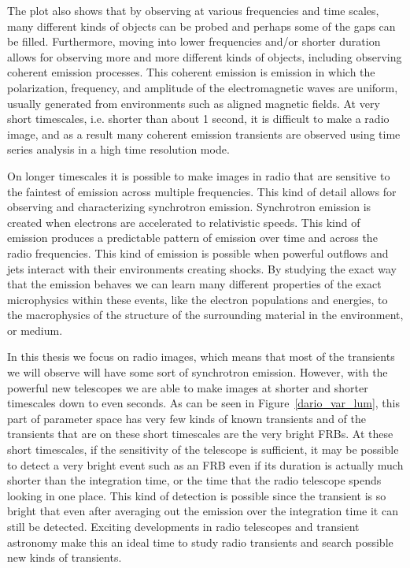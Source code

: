 \documentclass[12pt]{article}
\begin{document}
The plot also shows that by observing at various frequencies and time scales, many different kinds of objects can be probed and perhaps some of the gaps can be filled. Furthermore, moving into lower frequencies and/or shorter duration allows for observing more and more different kinds of objects, including observing coherent emission processes. This coherent emission is emission in which the polarization, frequency, and amplitude of the electromagnetic waves are uniform, usually generated from environments such as aligned magnetic fields. At very short timescales, i.e. shorter than about 1 second, it is difficult to make a radio image, and as a result many coherent emission transients are observed using time series analysis in a high time resolution mode. 

On longer timescales it is possible to make images in radio that are sensitive to the faintest of emission across multiple frequencies. This kind of detail allows for observing and characterizing synchrotron emission. Synchrotron emission is created when electrons are accelerated to relativistic speeds. This kind of emission produces a predictable pattern of emission over time and across the radio frequencies. This kind of emission is possible when powerful outflows and jets interact with their environments creating shocks. By studying the exact way that the emission behaves we can learn many different properties of the exact microphysics within these events, like the electron populations and energies, to the macrophysics of the structure of the surrounding material in the environment, or medium.


 In this thesis we focus on radio images, which means that most of the transients we will observe will have some sort of synchrotron emission. However, with the powerful new telescopes we are able to make images at shorter and shorter timescales down to even seconds. As can be seen in Figure~\ref{dario_var_lum}, this part of parameter space has very few kinds of known transients and of the transients that are on these short timescales are the very bright FRBs. At these short timescales, if the sensitivity of the telescope is sufficient, it may be possible to detect a very bright event such as an FRB even if its duration is actually much shorter than the integration time, or the time that the radio telescope spends looking in one place.  This kind of detection is possible since the transient is so bright that even after averaging out the emission over the integration time it can still be detected. Exciting developments in radio telescopes and transient astronomy make this an ideal time to study radio transients and search possible new kinds of transients.
\end{document}
